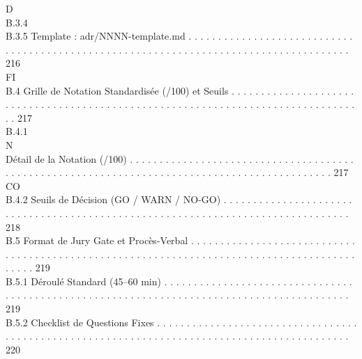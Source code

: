 \vspace{0.5em}
\vspace{0.5em}
\vspace{0.5em}
\vspace{0.5em}
D\\
B.3.4\\
B.3.5              Template : adr/NNNN-template.md . . . . . . . . . . . . . . . . . . . . . . . . . . . . . . . . . . . . . . . . . . . . . . . . . . . . . . . . . . . . . . . . . . . . . . . . . . . . . . . . . . . . . . 216\\
\vspace{0.5em}
\vspace{0.5em}
\vspace{0.5em}
\vspace{0.5em}
FI\\
B.4     Grille de Notation Standardisée (/100) et Seuils . . . . . . . . . . . . . . . . . . . . . . . . . . . . . . . . . . . . . . . . . . . . . . . . . . . . . . . . . . . . . . . . . . . . . . . . . . . . . . . . . . 217\\
B.4.1\\
N\\
Détail de la Notation (/100) . . . . . . . . . . . . . . . . . . . . . . . . . . . . . . . . . . . . . . . . . . . . . . . . . . . . . . . . . . . . . . . . . . . . . . . . . . . . . . . . . . . . . . . . . . . . . 217\\
CO\\
B.4.2              Seuils de Décision (GO / WARN / NO-GO) . . . . . . . . . . . . . . . . . . . . . . . . . . . . . . . . . . . . . . . . . . . . . . . . . . . . . . . . . . . . . . . . . . . . . . . . . . . . . . . . 218\\
B.5     Format de Jury Gate et Procès-Verbal . . . . . . . . . . . . . . . . . . . . . . . . . . . . . . . . . . . . . . . . . . . . . . . . . . . . . . . . . . . . . . . . . . . . . . . . . . . . . . . . . . . . . . . . . . . . 219\\
B.5.1              Déroulé Standard (45–60 min) . . . . . . . . . . . . . . . . . . . . . . . . . . . . . . . . . . . . . . . . . . . . . . . . . . . . . . . . . . . . . . . . . . . . . . . . . . . . . . . . . . . . . . . . . . 219\\
B.5.2              Checklist de Questions Fixes . . . . . . . . . . . . . . . . . . . . . . . . . . . . . . . . . . . . . . . . . . . . . . . . . . . . . . . . . . . . . . . . . . . . . . . . . . . . . . . . . . . . . . . . . . . . 220\\
